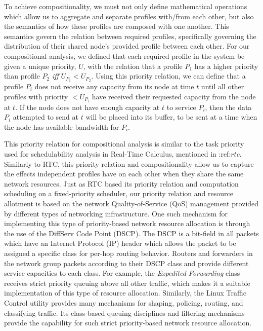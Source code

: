 To achieve compositionality, we must not only define mathematical
operations which allow us to aggregate and separate profiles with/from
each other, but also the semantics of how these profiles are composed
with one another.  This semantics govern the relation between
required profiles, specifically governing the distribution of their
shared node's provided profile between each other.  For our
compositional analysis, we defined that each required profile in the
system be given a unique priority, $U$, with the relation that a
profile $P_1$ has a higher priority than profile $P_2$
\emph{iff} $U_{P_1} < U_{P_2}$.  Using this priority relation, we can
define that a profile $P_i$ does not receive any capacity from
its node at time $t$ until all other profiles with priority
$< U_{P_i}$ have received their requested capacity from the
node at $t$.  If the node does not have enough capacity at
$t$ to service $P_i$, then the data $P_i$ attempted
to send at $t$ will be placed into its buffer, to be sent at a
time when the node has available bandwidth for $P_i$.

This priority relation for compositional analysis is similar to the
task priority used for schedulability analysis in Real-Time Calculus,
mentioned in :ref:$rtc$.  Similarly to RTC, this priority relation and
compositionality allow us to capture the effects independent profiles
have on each other when they share the same network resources.  Just
as RTC based its priority relation and computation scheduling on a
fixed-priority scheduler, our priority relation and resource allotment
is based on the network Quality-of-Service (QoS) management provided
by different types of networking infrastructure.  One such mechanism
for implementing this type of priority-based network resource
allocation is through the use of the DiffServ Code Point
(DSCP)\cite{rfc2474}.  The DSCP is a bit-field in all packets which
have an Internet Protocol (IP) header which allows the packet to be
assigned a specific class for per-hop routing behavior.  Routers and
forwarders in the network group packets according to their DSCP class
and provide different service capacities to each class.  For example,
the \emph{Expedited Forwarding} \cite{rfc3246} class receives strict
priority queuing above all other traffic, which makes it a suitable
implementation of this type of resource allocation.  Similarly, the
Linux Traffic Control\cite{linux_tc} utility provides many mechanisms
for shaping, policing, routing, and classifying traffic.  Its
class-based queuing disciplines and filtering mechanisms provide the
capability for such strict priority-based network resource
allocation.  

